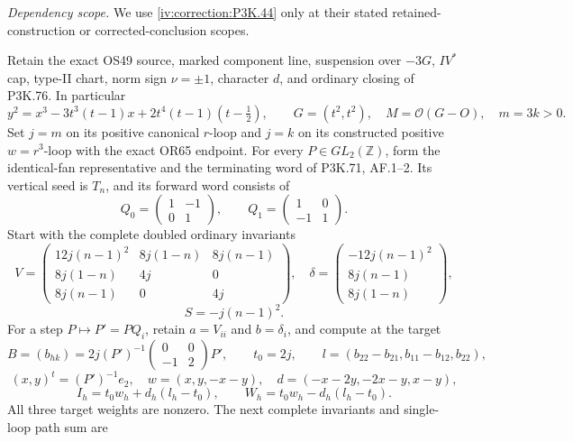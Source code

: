 \begin{theorem}\hypertarget{tag-02VP}{}\label{night:P3K.77}

\par\noindent\textit{Dependency scope.} We use \cref{iv:correction:P3K.44} only at their stated retained-construction or corrected-conclusion scopes.


Retain the exact OS49 source, marked component line, suspension over
\(-3G\), \(IV^*\) cap, type-II chart, norm sign \(\nu=\pm1\),
character \(d\), and ordinary closing of P3K.76. In particular
\[
 y^2=x^3-3t^3(t-1)x+2t^4(t-1)(t-\tfrac12),\qquad
 G=(t^2,t^2),\quad M=\mathcal O(G-O),\quad m=3k>0.
\]
Set \(j=m\) on its positive canonical \(r\)-loop and \(j=k\)
on its constructed positive \(w=r^3\)-loop with the exact OR65
endpoint. For every \(P\in GL_2(\mathbb Z)\), form the identical-fan
representative and the terminating word of P3K.71, AF.1--2.
Its vertical seed is \(T_n\), and its forward word consists of
\[
 Q_0=\begin{pmatrix}1&-1\\0&1\end{pmatrix},\qquad
 Q_1=\begin{pmatrix}1&0\\-1&1\end{pmatrix}.
\]
Start with the complete doubled ordinary invariants
\[
 V=\begin{pmatrix}
 12j(n-1)^2&8j(1-n)&8j(n-1)\\
 8j(1-n)&4j&0\\8j(n-1)&0&4j
 \end{pmatrix},\quad
 \delta=\begin{pmatrix}-12j(n-1)^2\\8j(n-1)\\8j(1-n)\end{pmatrix},
\]
\[
                         S=-j(n-1)^2.                 \tag{OF.1}
\]
For a step \(P\mapsto P'=PQ_i\), retain \(a=V_{ii}\) and
\(b=\delta_i\), and compute at the target
\[
 B=(b_{hk})=2j(P')^{-1}
           \begin{pmatrix}0&0\\-1&2\end{pmatrix}P',\qquad
 t_0=2j,\qquad
 l=(b_{22}-b_{21},b_{11}-b_{12},b_{22}),
\]
\[
 (x,y)^t=(P')^{-1}e_2,\quad
 w=(x,y,-x-y),\quad d=(-x-2y,-2x-y,x-y),
\]
\[
 I_h=t_0w_h+d_h(l_h-t_0),\qquad
 W_h=t_0w_h-d_h(l_h-t_0).                             \tag{OF.2}
\]
All three target weights are nonzero. The next complete invariants
and single-loop path sum are

\end{theorem}
